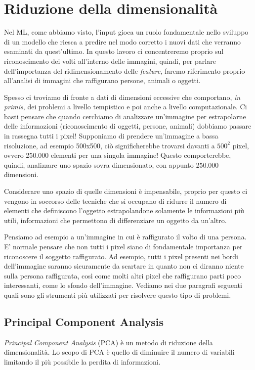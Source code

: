 \documentclass[12pt,italian]{report}
\begin{document}
\section{Riduzione della dimensionalità}

Nel ML, come abbiamo visto, l'input gioca un ruolo fondamentale nello sviluppo di un modello che riesca a predire nel modo corretto i nuovi dati che verranno esaminati da quest'ultimo.
In questo lavoro ci concentreremo proprio sul riconoscimento dei volti all'interno delle immagini, quindi, per parlare dell'importanza del ridimensionamento delle \emph{feature}, faremo riferimento proprio all'analisi di immagini che raffigurano persone, animali o oggetti.

Spesso ci troviamo di fronte a dati di dimensioni eccessive che comportano, \emph{in primis}, dei problemi a livello tempistico e poi anche a livello computazionale. Ci basti pensare che quando cerchiamo di analizzare un'immagine per estrapolarne delle informazioni (riconoscimento di oggetti, persone, animali) dobbiamo passare in rassegna tutti i pixel! Supponiamo di prendere un'immagine a bassa risoluzione, ad esempio 500x500, ciò significherebbe trovarsi davanti a $ 500^2 $ pixel, ovvero 250.000 elementi per una singola immagine! Questo comporterebbe, quindi, analizzare uno spazio sovra dimensionato, con appunto 250.000 dimensioni.

Considerare uno spazio di quelle dimensioni è impensabile, proprio per questo ci vengono in soccorso delle tecniche che si occupano di ridurre il numero di elementi che definiscono l'oggetto estrapolandone solamente le informazioni più utili, informazioni che permettono di differenziare un oggetto da un'altro.

Pensiamo ad esempio a un'immagine in cui è raffigurato il volto di una persona. E' normale pensare che non tutti i pixel siano di fondamentale importanza per riconoscere il soggetto raffigurato. Ad esempio, tutti i pixel presenti nei bordi dell'immagine saranno sicuramente da scartare in quanto non ci diranno niente sulla persona raffigurata, così come molti altri pixel che raffigurano parti poco interessanti, come lo sfondo dell'immagine. Vediamo nei due paragrafi seguenti quali sono gli strumenti più utilizzati per risolvere questo tipo di problemi.


\subsection{Principal Component Analysis}
\emph{Principal Component Analysis} (PCA) è un metodo di riduzione della dimensionalità. Lo scopo di PCA è quello di diminuire il numero di variabili limitando il più possibile la perdita di informazioni. 
\end{document}
